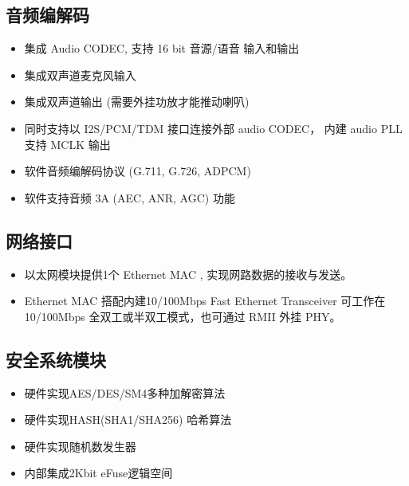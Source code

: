 \documentclass[letterpaper,10pt,english]{sphinxmanual}
\begin{document}
\subsection{音频编解码}
\label{\detokenize{contents/system-overview/features:id6}}\begin{itemize}
\item {} 
\sphinxAtStartPar
集成 Audio CODEC, 支持 16 bit 音源/语音 输入和输出

\item {} 
\sphinxAtStartPar
集成双声道麦克风输入

\item {} 
\sphinxAtStartPar
集成双声道输出 (需要外挂功放才能推动喇叭)

\item {} 
\sphinxAtStartPar
同时支持以 I2S/PCM/TDM    接口连接外部 audio    CODEC，  内建 audio        PLL     支持 MCLK 输出

\item {} 
\sphinxAtStartPar
软件音频编解码协议 (G.711, G.726, ADPCM)

\item {} 
\sphinxAtStartPar
软件支持音频 3A (AEC, ANR, AGC) 功能

\end{itemize}


\subsection{网络接口}
\label{\detokenize{contents/system-overview/features:id7}}\begin{itemize}
\item {} 
\sphinxAtStartPar
以太网模块提供1个 Ethernet MAC , 实现网路数据的接收与发送。

\item {} 
\sphinxAtStartPar
Ethernet MAC 搭配内建10/100Mbps Fast Ethernet Transceiver
可工作在10/100Mbps 全双工或半双工模式，也可通过 RMII 外挂 PHY。

\end{itemize}


\subsection{安全系统模块}
\label{\detokenize{contents/system-overview/features:id8}}\begin{itemize}
\item {} 
\sphinxAtStartPar
硬件实现AES/DES/SM4多种加解密算法

\item {} 
\sphinxAtStartPar
硬件实现HASH(SHA1/SHA256) 哈希算法

\item {} 
\sphinxAtStartPar
硬件实现随机数发生器

\item {} 
\sphinxAtStartPar
内部集成2Kbit eFuse逻辑空间

\end{itemize}
\end{document}
